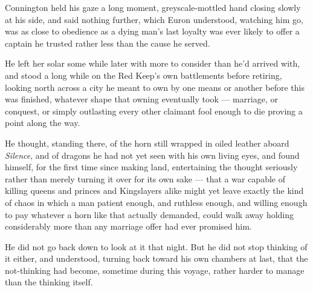 Connington held his gaze a long moment, greyscale-mottled hand closing slowly at his side, and said nothing further, which Euron understood, watching him go, was as close to obedience as a dying man’s last loyalty was ever likely to offer a captain he trusted rather less than the cause he served.

\sceneBreak

He left her solar some while later with more to consider than he’d arrived with, and stood a long while on the Red Keep’s own battlements before retiring, looking north across a city he meant to own by one means or another before this was finished, whatever shape that owning eventually took — marriage, or conquest, or simply outlasting every other claimant fool enough to die proving a point along the way.

He thought, standing there, of the horn still wrapped in oiled leather aboard \textit{Silence}, and of dragons he had not yet seen with his own living eyes, and found himself, for the first time since making land, entertaining the thought seriously rather than merely turning it over for its own sake — that a war capable of killing queens and princes and Kingslayers alike might yet leave exactly the kind of chaos in which a man patient enough, and ruthless enough, and willing enough to pay whatever a horn like that actually demanded, could walk away holding considerably more than any marriage offer had ever promised him.

He did not go back down to look at it that night. But he did not stop thinking of it either, and understood, turning back toward his own chambers at last, that the not-thinking had become, sometime during this voyage, rather harder to manage than the thinking itself.